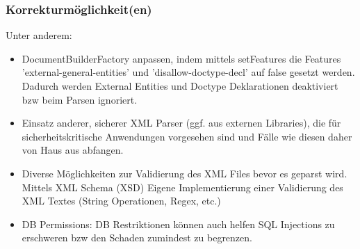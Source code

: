 \documentclass[12pt,a4paper,titlepage,oneside]{scrartcl}
\begin{document}
\subsubsection{Korrekturmöglichkeit(en)}
\noindent
Unter anderem:
\begin{itemize}
\item DocumentBuilderFactory anpassen, indem mittels setFeatures die Features 'external-general-entities' und 'disallow-doctype-decl' auf false gesetzt werden. 
Dadurch werden External Entities und Doctype Deklarationen deaktiviert bzw beim Parsen ignoriert.
\item Einsatz anderer, sicherer XML Parser (ggf. aus externen Libraries), die für sicherheitskritische Anwendungen vorgesehen sind und Fälle wie diesen daher von Haus aus abfangen.
\item Diverse Möglichkeiten zur Validierung des XML Files bevor es geparst wird.
\subitem Mittels XML Schema (XSD)
\subitem Eigene Implementierung einer Validierung des XML Textes (String Operationen, Regex, etc.)
\item DB Permissions: DB Restriktionen können auch helfen SQL Injections zu erschweren bzw den Schaden zumindest zu begrenzen.
\end{itemize}
\end{document}
